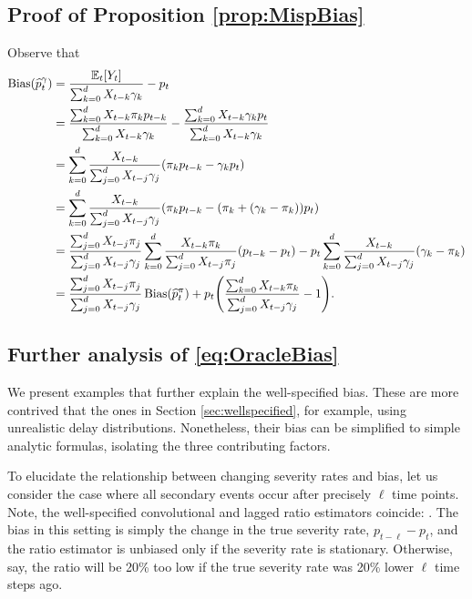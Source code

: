 \documentclass{article}
\renewcommand{\hat}{\widehat} %
\DeclareMathOperator{\bias}{Bias}
\begin{document}
\subsection{Proof of Proposition \ref{prop:MispBias}}
\label{apx:MispBias}

Observe that
\begin{align*}
\bias(\hat{p}_t^\gamma) 
&= \frac{\E_t[Y_t]}{\sum_{k=0}^d X_{t-k}\gamma_k} - p_t \\
&= \frac{\sum_{k=0}^d X_{t-k}\pi_k p_{t-k}}{\sum_{k=0}^d X_{t-k}\gamma_k} -
\frac{\sum_{k=0}^d X_{t-k}\gamma_k p_t}{\sum_{k=0}^d X_{t-k}\gamma_k} \\
&= \sum_{k=0}^d \frac{X_{t-k}}{\sum_{j=0}^d X_{t-j}\gamma_j}
(\pi_k p_{t-k} - \gamma_k p_t) \\
&= \sum_{k=0}^d \frac{X_{t-k}}{\sum_{j=0}^d X_{t-j}\gamma_j}
(\pi_k p_{t-k}-(\pi_k +(\gamma_k-\pi_k)) p_t) \\
&= \frac{\sum_{j=0}^d X_{t-j}\pi_j}{\sum_{j=0}^d X_{t-j}\gamma_j}
\sum_{k=0}^d \frac{X_{t-k}\pi_k}{\sum_{j=0}^d X_{t-j}\pi_j}(p_{t-k}-p_t) -
p_t\sum_{k=0}^d \frac{X_{t-k}}{\sum_{j=0}^d X_{t-j}\gamma_j}(\gamma_k -\pi_k) \\ 
&= \frac{\sum_{j=0}^d X_{t-j}\pi_j}{\sum_{j=0}^d X_{t-j}\gamma_j} 
\bias(\hat{p}_t^\pi) + p_t\Bigg( \frac{\sum_{k=0}^d X_{t-k}\pi_k} 
{\sum_{j=0}^d X_{t-j}\gamma_j}-1\Bigg).
\end{align*}

\subsection{Further analysis of \eqref{eq:OracleBias}}
\label{apx:analysis}

We present examples that further explain the well-specified bias. These are more
contrived that the ones in Section \ref{sec:wellspecified}, for example, using
unrealistic delay distributions. Nonetheless, their bias can be simplified to 
simple analytic formulas, isolating the three contributing factors. 

To elucidate the relationship between changing severity rates and bias, let us
consider the case where all secondary events occur after precisely $\ell$ time  
points. Note, the well-specified convolutional and lagged ratio estimators
coincide: \smash{$\hat{p}_t^\gamma = \hat{p}_t^\ell = p_{t-\ell}$}. The bias in
this setting is simply the change in the true severity rate, $p_{t-\ell} - p_t$, 
and the ratio estimator is unbiased only if the severity rate is stationary. 
Otherwise, say, the ratio will be 20\% too low if the true severity rate was
20\% lower $\ell$ time steps ago. 
\end{document}
